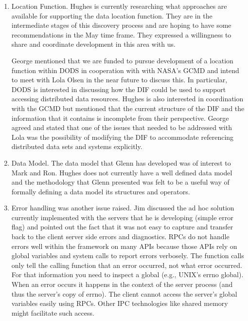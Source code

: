 \begin{enumerate}
   \item  Location Function.  Hughes is currently researching what approaches
   are available for supporting the data location function.  They are 
   in the intermediate stages of this discovery process and are hoping to
   have some recommendations in the May time frame.  They expressed a
   willingness to share and coordinate development in this area with us.

   George mentioned that we are funded to pursue development of a location
   function within DODS in cooperation with with NASA's GCMD and intend to
   meet with Lola Olsen in the near future to discuss this.  In particular,
   DODS is interested in discussing how the DIF could be used to support
   accessing distributed data resources.  Hughes is also interested in
   coordination with the GCMD but mentioned that the current structure of the
   DIF and the information that it contains is incomplete from their
   perspective.  George agreed and stated that one of the issues that needed
   to be addressed with Lola was the possibility of modifying the DIF to
   accommodate referencing distributed data sets and systems explicitly.


   \item Data Model.  The data model that Glenn has developed was of interest
   to Mark and Ron.  Hughes does not currently have a well defined
data model and the methodology that Glenn presented was felt to be a
useful way of formally defining a data model its structures and operators.  

   \item Error handling was another issue raised.  Jim discussed the
   ad hoc solution currently implemented with the servers that he is
   developing (simple error flag) and pointed out the fact that it was
   not easy to capture and transfer back to the client server side
   errors and diagnostics.  RPCs do not handle errors well within the
   framework on many APIs because those APIs rely on global variables
   and system calls to report errors verbosely. The function calls
   only tell the calling function that an error occurred, not what
   error occurred. For that information you need to inspect a global
   (e.g., UNIX's errno global). When an error occurs it happens in the
   context of the server process (and thus the server's copy of
   errno). The client cannot access the server's global variables
   easily using RPCs. Other IPC technologies like shared memory might
   facilitate such access.  


\end{enumerate}
